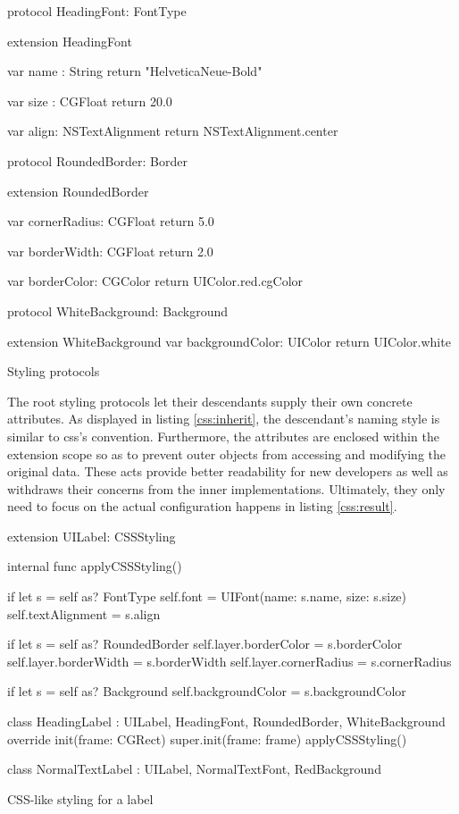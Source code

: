 \documentclass[11pt,a4paper,oneside,article]{memoir}
\begin{document}
\begin{listing}[H]
\begin{SwiftCode}
protocol HeadingFont: FontType{}

extension HeadingFont{
    var name : String {
        return "HelveticaNeue-Bold"
    }
    
    var size : CGFloat {
        return 20.0
    }
    
    var align: NSTextAlignment {
        return NSTextAlignment.center
    }
}

protocol RoundedBorder: Border {}

extension RoundedBorder {
    var cornerRadius: CGFloat {
        return 5.0
    }
    
    var borderWidth: CGFloat {
        return 2.0
    }
    
    var borderColor: CGColor {
        return UIColor.red.cgColor
    }
}

protocol WhiteBackground: Background {}

extension WhiteBackground {
    var backgroundColor: UIColor {
        return UIColor.white
    }
}


\end{SwiftCode}
\caption{Styling protocols}
\label{css:inherit}
\end{listing}

The root styling protocols let their descendants supply their own concrete attributes. As displayed in listing \ref{css:inherit}, the descendant's naming style is similar to \gls{css}'s convention. Furthermore, the attributes are enclosed within the extension scope so as to prevent outer objects from accessing and modifying the original data. These acts provide better readability for new developers as well as withdraws their concerns from the inner implementations. Ultimately, they only need to focus on the actual configuration happens in listing \ref{css:result}.

\begin{listing}[h]
\begin{SwiftCode}
extension UILabel: CSSStyling {
    internal func applyCSSStyling() {
        if let s = self as? FontType {
            self.font = UIFont(name: s.name, size: s.size)
            self.textAlignment = s.align
        }
        
        if let s = self as? RoundedBorder {
            self.layer.borderColor = s.borderColor
            self.layer.borderWidth = s.borderWidth
            self.layer.cornerRadius = s.cornerRadius
        }
        
        if let s = self as? Background {
            self.backgroundColor = s.backgroundColor
        }
    }
}

class HeadingLabel : UILabel, HeadingFont, RoundedBorder, WhiteBackground {
    override init(frame: CGRect) {
        super.init(frame: frame)
        applyCSSStyling()
    }
}

class NormalTextLabel : UILabel, NormalTextFont, RedBackground{}
\end{SwiftCode}
\caption{CSS-like styling for a label}
\label{css:result}
\end{listing}
\end{document}
